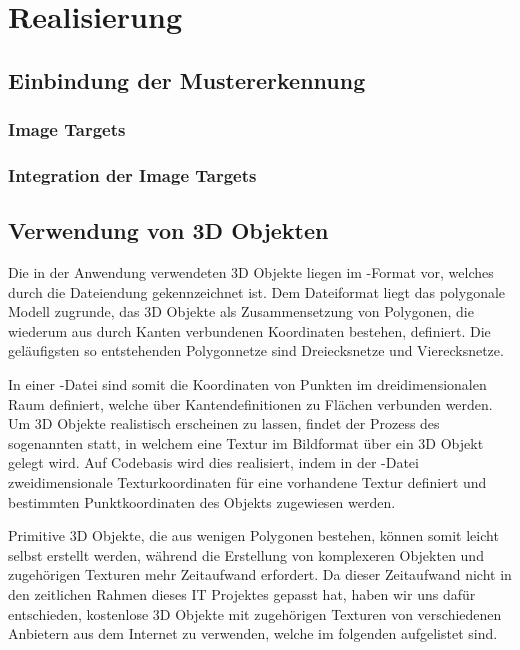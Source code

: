 \chapter{Realisierung}\label{ch:realisierung_der_anwendung}
\section{Einbindung der Mustererkennung}
\subsection{Image Targets}
\subsection{Integration der Image Targets}\label{integration_image_targets}

\section{Verwendung von 3D Objekten}
Die in der Anwendung verwendeten 3D Objekte liegen im -Format vor, welches durch die Dateiendung  gekennzeichnet ist. 
Dem Dateiformat liegt das polygonale Modell zugrunde, das 3D Objekte als Zusammensetzung von Polygonen, die wiederum aus durch Kanten verbundenen Koordinaten bestehen, definiert. 
Die geläufigsten so entstehenden Polygonnetze sind Dreiecksnetze und Vierecksnetze.

In einer  -Datei sind somit die Koordinaten von Punkten im dreidimensionalen Raum definiert, welche über Kantendefinitionen zu Flächen verbunden werden. 
Um 3D Objekte realistisch erscheinen zu lassen, findet der Prozess des sogenannten  statt, in welchem eine Textur im Bildformat über ein 3D Objekt gelegt wird. 
Auf Codebasis wird dies realisiert, indem in der -Datei zweidimensionale Texturkoordinaten für eine vorhandene Textur definiert und bestimmten Punktkoordinaten des Objekts zugewiesen werden.

Primitive 3D Objekte, die aus wenigen Polygonen bestehen, können somit leicht selbst erstellt werden, während die Erstellung von komplexeren Objekten und zugehörigen Texturen mehr Zeitaufwand erfordert. 
Da dieser Zeitaufwand nicht in den zeitlichen Rahmen dieses IT Projektes gepasst hat, haben wir uns dafür entschieden, kostenlose 3D Objekte mit zugehörigen Texturen von verschiedenen Anbietern aus dem Internet zu verwenden, welche im folgenden aufgelistet sind.

